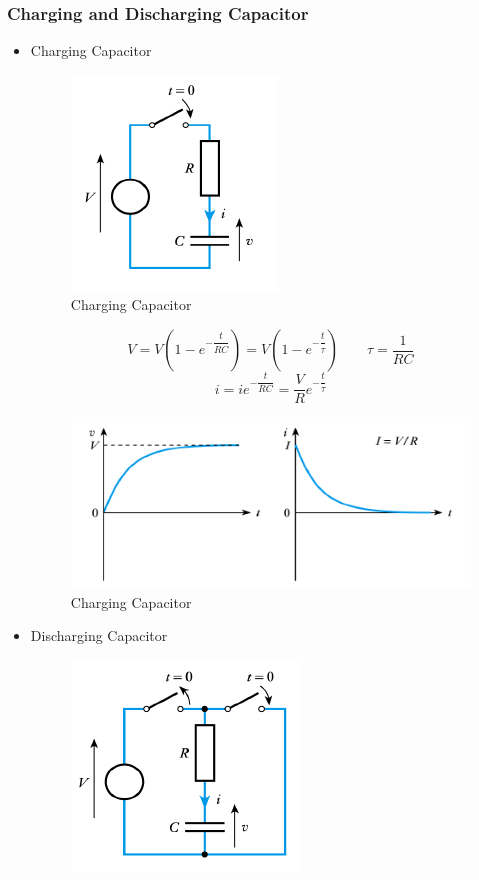 \documentclass[UTF8]{article}
\begin{document}
\subsubsection{Charging and Discharging Capacitor}
\begin{itemize}
\item Charging Capacitor
\begin{figure}[H]
\centering
\includegraphics[scale=0.9]{a1.PNG}
\caption{Charging Capacitor}
\end{figure}
$$V=V(1-e^{-\dfrac{t}{RC}})=V(1-e^{-\dfrac{t}{\tau}}) \qquad \tau =\dfrac{1}{RC}$$
$$i=ie^{-\dfrac{t}{RC}}=\dfrac{V}{R}e^{-\dfrac{t}{\tau}}$$
\begin{figure}[H]
\centering
\includegraphics[scale=0.9]{a2.PNG}
\caption{Charging Capacitor}
\end{figure}
\item Discharging Capacitor
\begin{figure}[H]
\centering
\includegraphics[scale=0.9]{a3.PNG}

\end{figure}
\end{itemize}
\end{document}
